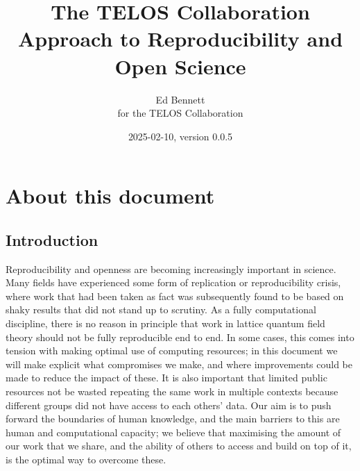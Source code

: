 \documentclass{article}
\title{The TELOS Collaboration Approach to Reproducibility and Open Science}
\author{Ed Bennett\\for the TELOS Collaboration}
\date{2025-02-10, version 0.0.5}
\begin{document}
\maketitle


\makeatletter
\renewcommand\tableofcontents{%
    \subsection{\contentsname
        \@mkboth{%
           \MakeUppercase\contentsname}{\MakeUppercase\contentsname}}%
    \@starttoc{toc}%
  }
\makeatother

\section{About this document}

\subsection{Introduction}

Reproducibility and openness are becoming increasingly important in science.
Many fields have experienced some form of replication or reproducibility crisis,
where work that had been taken as fact was subsequently found
to be based on shaky results that did not stand up to scrutiny.
As a fully computational discipline,
there is no reason in principle
that work in lattice quantum field theory should not be fully reproducible end to end.
In some cases,
this comes into tension with making optimal use of computing resources;
in this document we will make explicit what compromises we make,
and where improvements could be made to reduce the impact of these.
It is also important that limited public resources not be wasted
repeating the same work in multiple contexts
because different groups did not have access to each others' data.
Our aim is to push forward the boundaries of human knowledge,
and the main barriers to this are human and computational capacity;
we believe that maximising the amount of our work that we share,
and the ability of others to access and build on top of it,
is the optimal way to overcome these.
\end{document}
